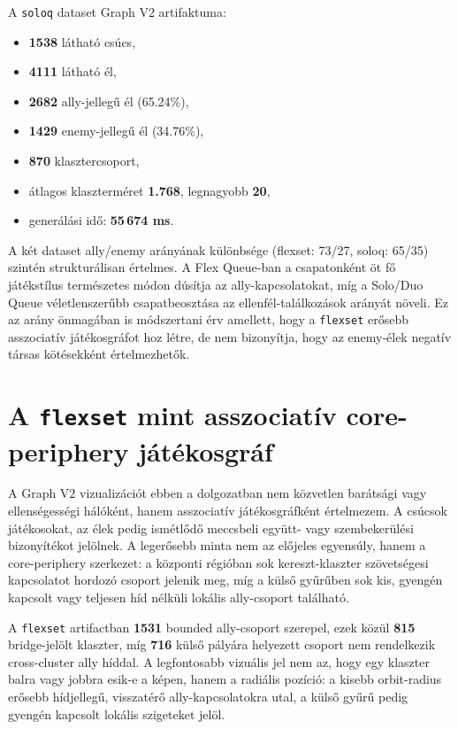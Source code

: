 ﻿\documentclass[a4paper,12pt]{report}
\begin{document}
A \texttt{soloq} dataset Graph V2 artifaktuma:

\begin{itemize}
    \item \textbf{1538} látható csúcs,
    \item \textbf{4111} látható él,
    \item \textbf{2682} ally-jellegű él (65.24\%),
    \item \textbf{1429} enemy-jellegű él (34.76\%),
    \item \textbf{870} klasztercsoport,
    \item átlagos klaszterméret \textbf{1.768}, legnagyobb \textbf{20},
    \item generálási idő: \textbf{55\,674 ms}.
\end{itemize}

A két dataset ally/enemy arányának különbsége (flexset: 73/27, soloq: 65/35) szintén strukturálisan értelmes. A Flex Queue-ban a csapatonként öt fő játékstílus természetes módon dúsítja az ally-kapcsolatokat, míg a Solo/Duo Queue véletlenszerűbb csapatbeosztása az ellenfél-találkozások arányát növeli. Ez az arány önmagában is módszertani érv amellett, hogy a \texttt{flexset} erősebb asszociatív játékosgráfot hoz létre, de nem bizonyítja, hogy az enemy-élek negatív társas kötésekként értelmezhetők.

\section{A \texttt{flexset} mint asszociatív core-periphery játékosgráf}

A Graph V2 vizualizációt ebben a dolgozatban nem közvetlen barátsági vagy ellenségességi hálóként, hanem asszociatív játékosgráfként értelmezem. A csúcsok játékosokat, az élek pedig ismétlődő meccsbeli együtt- vagy szembekerülési bizonyítékot jelölnek. A legerősebb minta nem az előjeles egyensúly, hanem a core-periphery szerkezet: a központi régióban sok kereszt-klaszter szövetségesi kapcsolatot hordozó csoport jelenik meg, míg a külső gyűrűben sok kis, gyengén kapcsolt vagy teljesen híd nélküli lokális ally-csoport található.

A \texttt{flexset} artifactban \textbf{1531} bounded ally-csoport szerepel, ezek közül \textbf{815} bridge-jelölt klaszter, míg \textbf{716} külső pályára helyezett csoport nem rendelkezik cross-cluster ally híddal. A legfontosabb vizuális jel nem az, hogy egy klaszter balra vagy jobbra esik-e a képen, hanem a radiális pozíció: a kisebb orbit-radius erősebb hídjellegű, visszatérő ally-kapcsolatokra utal, a külső gyűrű pedig gyengén kapcsolt lokális szigeteket jelöl.
\end{document}

